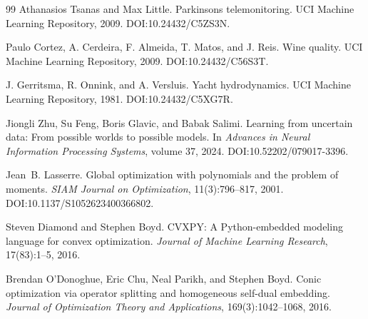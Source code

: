 \begin{thebibliography}{99}
Athanasios Tsanas and Max Little.
\newblock Parkinsons telemonitoring.
\newblock UCI Machine Learning Repository, 2009.
\newblock DOI:10.24432/C5ZS3N.

Paulo Cortez, A. Cerdeira, F. Almeida, T. Matos, and J. Reis.
\newblock Wine quality.
\newblock UCI Machine Learning Repository, 2009.
\newblock DOI:10.24432/C56S3T.

J. Gerritsma, R. Onnink, and A. Versluis.
\newblock Yacht hydrodynamics.
\newblock UCI Machine Learning Repository, 1981.
\newblock DOI:10.24432/C5XG7R.

Jiongli Zhu, Su Feng, Boris Glavic, and Babak Salimi.
\newblock Learning from uncertain data: From possible worlds to possible models.
\newblock In \emph{Advances in Neural Information Processing Systems}, volume 37, 2024.
\newblock DOI:10.52202/079017-3396.

Jean~B. Lasserre.
\newblock Global optimization with polynomials and the problem of moments.
\newblock \emph{SIAM Journal on Optimization}, 11(3):796--817, 2001.
\newblock DOI:10.1137/S1052623400366802.

Steven Diamond and Stephen Boyd.
\newblock CVXPY: A Python-embedded modeling language for convex optimization.
\newblock \emph{Journal of Machine Learning Research}, 17(83):1--5, 2016.

Brendan O'Donoghue, Eric Chu, Neal Parikh, and Stephen Boyd.
\newblock Conic optimization via operator splitting and homogeneous self-dual embedding.
\newblock \emph{Journal of Optimization Theory and Applications}, 169(3):1042--1068, 2016.

\end{thebibliography}
